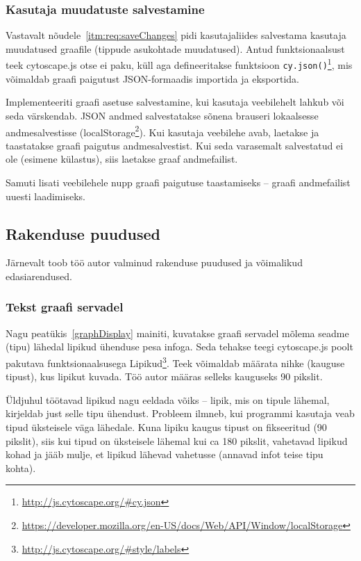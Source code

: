\documentclass[12pt]{article}
\begin{document}
\subsubsection{Kasutaja muudatuste salvestamine} \label{saveChanges}
Vastavalt nõudele~\ref{itm:req:saveChanges} pidi kasutajaliides salvestama kasutaja muudatused
graafile (tippude asukohtade muudatused).
Antud funktsionaalsust teek cytoscape.js otse ei paku, küll aga defineeritakse funktsioon
\texttt{cy.json()}\footnote{\url{http://js.cytoscape.org/\#cy.json}}, mis võimaldab graafi paigutust
JSON-formaadis importida ja eksportida.

Implementeeriti graafi asetuse salvestamine, kui kasutaja veebilehelt lahkub või seda värskendab.
JSON andmed salvestatakse sõnena brauseri lokaalsesse andmesalvestisse
(localStorage\footnote{\url{https://developer.mozilla.org/en-US/docs/Web/API/Window/localStorage}}).
Kui kasutaja veebilehe avab, laetakse ja taastatakse graafi paigutus andmesalvestist.
Kui seda varasemalt salvestatud ei ole (esimene külastus), siis laetakse graaf andmefailist.

Samuti lisati veebilehele nupp graafi paigutuse taastamiseks -- graafi andmefailist uuesti
laadimiseks.

\subsection{Rakenduse puudused}
Järnevalt toob töö autor valminud rakenduse puudused ja võimalikud edasiarendused.

\subsubsection{Tekst graafi servadel}
Nagu peatükis~\ref{graphDisplay} mainiti, kuvatakse graafi servadel mõlema seadme (tipu) lähedal
lipikud ühenduse pesa infoga.
Seda tehakse teegi cytoscape.js poolt pakutava
funktsionaalsusega Lipikud\footnote{\url{http://js.cytoscape.org/\#style/labels}}.
Teek võimaldab määrata nihke (kauguse tipust), kus lipikut kuvada.
Töö autor määras selleks kauguseks 90 pikslit.

Üldjuhul töötavad lipikud nagu eeldada võiks -- lipik, mis on tipule lähemal, kirjeldab just selle
tipu ühendust.
Probleem ilmneb, kui programmi kasutaja veab tipud üksteisele väga lähedale.
Kuna lipiku kaugus tipust on fikseeritud (90 pikslit), siis kui tipud on üksteisele lähemal kui ca
180 pikslit,
vahetavad lipikud kohad ja jääb mulje, et lipikud lähevad vahetusse (annavad infot teise tipu
kohta).
\end{document}

